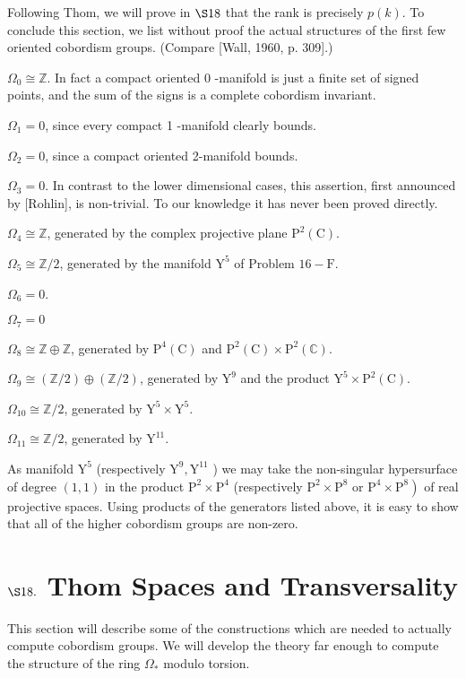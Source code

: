 \documentclass[10pt]{article}
\begin{document}
Following Thom, we will prove in $\S 18$ that the rank is precisely $p(k)$. To conclude this section, we list without proof the actual structures of the first few oriented cobordism groups. (Compare [Wall, 1960, p. 309].)

$\Omega_{0} \cong \mathbb{Z}$. In fact a compact oriented 0 -manifold is just a finite set of signed points, and the sum of the signs is a complete cobordism invariant.

$\Omega_{1}=0$, since every compact 1 -manifold clearly bounds.

$\Omega_{2}=0$, since a compact oriented 2-manifold bounds.

$\Omega_{3}=0$. In contrast to the lower dimensional cases, this assertion, first announced by [Rohlin], is non-trivial. To our knowledge it has never been proved directly.

$\Omega_{4} \cong \mathbb{Z}$, generated by the complex projective plane $\mathrm{P}^{2}(\mathrm{C})$.

$\Omega_{5} \cong \mathbb{Z} / 2$, generated by the manifold $\mathrm{Y}^{5}$ of Problem $16-\mathrm{F}$.

$\Omega_{6}=0$.

$\Omega_{7}=0$

$\Omega_{8} \cong \mathbb{Z} \oplus \mathbb{Z}$, generated by $\mathrm{P}^{4}(\mathrm{C})$ and $\mathrm{P}^{2}(\mathrm{C}) \times \mathrm{P}^{2}(\mathbb{C})$.

$\Omega_{9} \cong(\mathbb{Z} / 2) \oplus(\mathbb{Z} / 2)$, generated by $\mathrm{Y}^{9}$ and the product $\mathrm{Y}^{5} \times \mathrm{P}^{2}(\mathrm{C})$.

$\Omega_{10} \cong \mathbb{Z} / 2$, generated by $\mathrm{Y}^{5} \times \mathrm{Y}^{5}$.

$\Omega_{11} \cong \mathbb{Z} / 2$, generated by $\mathrm{Y}^{11}$.

As manifold $\mathrm{Y}^{5}$ (respectively $\mathrm{Y}^{9}, \mathrm{Y}^{11}$ ) we may take the non-singular hypersurface of degree $(1,1)$ in the product $\mathrm{P}^{2} \times \mathrm{P}^{4}$ (respectively $\mathrm{P}^{2} \times \mathrm{P}^{8}$ or $\left.\mathrm{P}^{4} \times \mathrm{P}^{8}\right)$ of real projective spaces. Using products of the generators listed above, it is easy to show that all of the higher cobordism groups are non-zero.

\section{$\S 18 .$ Thom Spaces and Transversality}
This section will describe some of the constructions which are needed to actually compute cobordism groups. We will develop the theory far enough to compute the structure of the ring $\Omega_{*}$ modulo torsion.
\end{document}
